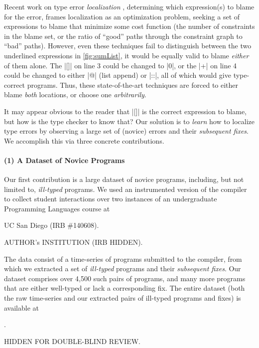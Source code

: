 Recent work on type error \emph{localization}
%
\citep[\eg][]{Zhang2014-lv,Loncaric2016-uk,Pavlinovic2014-mr},
%
determining which expression(s) to blame for the error,
frames localization as an optimization problem, seeking a set of
expressions to blame that minimize some cost function (\eg the number of
constraints in the blame set, or the ratio of ``good'' paths through the
constraint graph to ``bad'' paths).
%
However, even these techniques fail to distinguish between the two
underlined expressions in \autoref{fig:sumList}, it would be equally
valid to blame \emph{either} of them alone.
%
The |[]| on line 3 could be changed to |0|, or the |+| on line 4 could
be changed to either |@| (list append) or |::|, all of which would give
type-correct programs.
%
Thus, these state-of-the-art techniques are forced to either blame
\emph{both} locations, or choose one \emph{arbitrarily}.

It may appear obvious to the reader that |[]| is the correct expression
to blame, but how is the type checker to know that?
%
Our solution is to \emph{learn} how to localize type errors by observing
a large set of (novice) errors and their \emph{subsequent fixes}.
%
We accomplish this via three concrete contributions.

\paragraph{\textbf{(1) A Dataset of Novice \ocaml Programs}}
Our first contribution is a large dataset of novice \ocaml programs,
including, but not limited to, \emph{ill-typed} programs.
%
We used an instrumented version of the \ocaml compiler to collect
student interactions over two instances of an undergraduate Programming
Languages course at
%
\begin{anonsuppress}
UC San Diego (IRB \#140608).
\end{anonsuppress}
\begin{noanonsuppress}
AUTHOR's INSTITUTION (IRB HIDDEN).
\end{noanonsuppress}
%
The data consist of a time-series of programs submitted to the \ocaml
compiler, from which we extracted a set of \emph{ill-typed} programs
and their \emph{subsequent fixes}.
%
Our dataset comprises over 4,500 such pairs of programs, and many more
programs that are either well-typed or lack a corresponding fix.
%
The entire dataset (both the raw time-series and our extracted pairs of
ill-typed programs and fixes) is available at
%
\begin{anonsuppress}
.
\end{anonsuppress}
\begin{noanonsuppress}
HIDDEN FOR DOUBLE-BLIND REVIEW.
\end{noanonsuppress}
%


